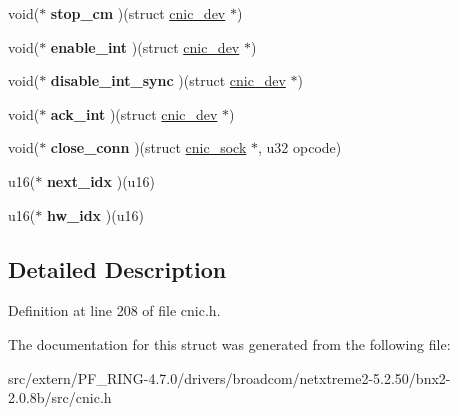 \begin{DoxyCompactItemize}
\item 
\hypertarget{structcnic__local_a7de61927671a5b7911e15bea9437b39c}{
void($\ast$ {\bfseries stop\_\-cm} )(struct \hyperlink{structcnic__dev}{cnic\_\-dev} $\ast$)}
\label{structcnic__local_a7de61927671a5b7911e15bea9437b39c}

\item 
\hypertarget{structcnic__local_a553f56bda296e5ece4a1b2c74e80eb08}{
void($\ast$ {\bfseries enable\_\-int} )(struct \hyperlink{structcnic__dev}{cnic\_\-dev} $\ast$)}
\label{structcnic__local_a553f56bda296e5ece4a1b2c74e80eb08}

\item 
\hypertarget{structcnic__local_a5663c31af9e8982382ede300ce83e62f}{
void($\ast$ {\bfseries disable\_\-int\_\-sync} )(struct \hyperlink{structcnic__dev}{cnic\_\-dev} $\ast$)}
\label{structcnic__local_a5663c31af9e8982382ede300ce83e62f}

\item 
\hypertarget{structcnic__local_af3c145fa85fee745c2cd12b3ab3216d5}{
void($\ast$ {\bfseries ack\_\-int} )(struct \hyperlink{structcnic__dev}{cnic\_\-dev} $\ast$)}
\label{structcnic__local_af3c145fa85fee745c2cd12b3ab3216d5}

\item 
\hypertarget{structcnic__local_ab8f9b4ae89eac1e812415e7a4a4b797b}{
void($\ast$ {\bfseries close\_\-conn} )(struct \hyperlink{structcnic__sock}{cnic\_\-sock} $\ast$, u32 opcode)}
\label{structcnic__local_ab8f9b4ae89eac1e812415e7a4a4b797b}

\item 
\hypertarget{structcnic__local_a2a2fc28ff451d08d83738c6e2949d403}{
u16($\ast$ {\bfseries next\_\-idx} )(u16)}
\label{structcnic__local_a2a2fc28ff451d08d83738c6e2949d403}

\item 
\hypertarget{structcnic__local_a0cdccdcc4b86b3f41865292cd20b73ba}{
u16($\ast$ {\bfseries hw\_\-idx} )(u16)}
\label{structcnic__local_a0cdccdcc4b86b3f41865292cd20b73ba}

\end{DoxyCompactItemize}


\subsection{Detailed Description}


Definition at line 208 of file cnic.h.



The documentation for this struct was generated from the following file:\begin{DoxyCompactItemize}
\item 
src/extern/PF\_\-RING-\/4.7.0/drivers/broadcom/netxtreme2-\/5.2.50/bnx2-\/2.0.8b/src/cnic.h\end{DoxyCompactItemize}
